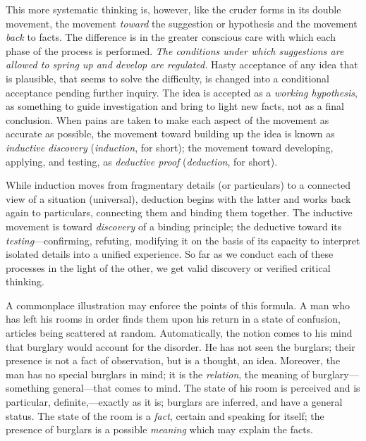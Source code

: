 \documentclass[letterpaper]{book}
\begin{document}

This more systematic thinking is, however, like the cruder forms in its
double movement, the movement \emph{toward} the suggestion or hypothesis
and the movement \emph{back} to facts. The difference is in the greater
conscious care with which each phase of the process is performed.
\emph{The conditions under which suggestions are allowed to spring up
and develop are regulated.} Hasty acceptance of any idea that is
plausible, that seems to solve the difficulty, is changed into a
conditional acceptance pending further inquiry. The idea is accepted as
a \emph{working hypothesis}, as something to guide investigation and
bring to light new facts, not as a final conclusion. When pains are
taken to make each aspect of the movement as accurate as possible, the
movement toward building up the idea is known as \emph{inductive
discovery} (\emph{induction}, for short); the movement toward
developing, applying, and testing, as \emph{deductive proof}
(\emph{deduction}, for short).


While induction moves from fragmentary details
(or
particulars) to a connected view of a situation (universal), deduction
begins with the latter and works back again to particulars, connecting
them and binding them together. The inductive movement is toward
\emph{discovery} of a binding principle; the deductive toward its
\emph{testing}---confirming, refuting, modifying it on the basis of its
capacity to interpret isolated details into a unified experience. So far
as we conduct each of these processes in the light of the other, we get
valid discovery or verified critical thinking.


A commonplace illustration may enforce the points of this formula. A man
who has left his rooms in order finds them upon his return in a state of
confusion, articles being scattered at random. Automatically, the notion
comes to his mind that burglary would account for the disorder. He has
not seen the burglars; their presence is not a fact of observation, but
is a thought, an idea. Moreover, the man has no special burglars in
mind; it is the \emph{relation}, the meaning of burglary---something
general---that comes to mind. The state of his room is perceived and is
particular, definite,---exactly as it is; burglars are inferred, and
have a general status. The state of the room is a \emph{fact}, certain
and speaking for itself; the presence of burglars is a possible
\emph{meaning} which may explain the facts.
\end{document}

